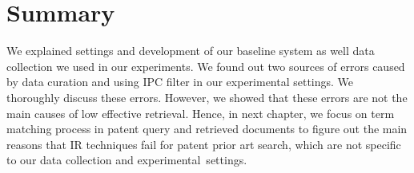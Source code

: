 \section{Summary}
\label{sce: summary3}
%
We explained settings and development of our baseline system 
as well data collection we used in our experiments. We found 
out two sources of errors caused by data curation and using 
IPC filter in our experimental settings. We thoroughly discuss 
these errors. However, we showed that these errors are not the 
main causes of low effective retrieval. Hence, in next chapter, 
we focus on term matching process in patent query and retrieved 
documents to figure out the main reasons that IR techniques fail 
for patent prior art search, which are not specific to our data 
collection and experimental~settings. 



